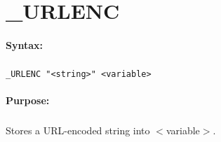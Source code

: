
\newpage
\section{\_URLENC}
\label{cmd:_URLENC}

\paragraph{Syntax:}
\subparagraph{}
\texttt{\_URLENC "<string>" <variable>}

\paragraph{Purpose:}
\subparagraph{}
Stores a URL-encoded string into $<$variable$>$.